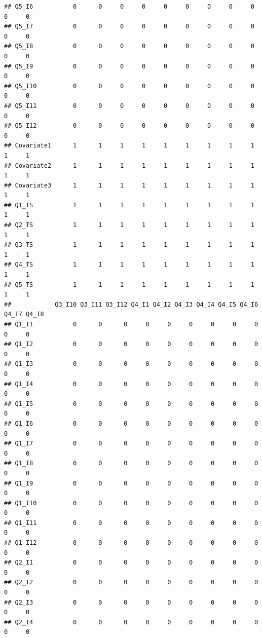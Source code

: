 \documentclass[
]{book}
\begin{document}
\begin{verbatim}
## Q5_I6           0      0     0     0     0     0     0     0     0     0     0
## Q5_I7           0      0     0     0     0     0     0     0     0     0     0
## Q5_I8           0      0     0     0     0     0     0     0     0     0     0
## Q5_I9           0      0     0     0     0     0     0     0     0     0     0
## Q5_I10          0      0     0     0     0     0     0     0     0     0     0
## Q5_I11          0      0     0     0     0     0     0     0     0     0     0
## Q5_I12          0      0     0     0     0     0     0     0     0     0     0
## Covariate1      1      1     1     1     1     1     1     1     1     1     1
## Covariate2      1      1     1     1     1     1     1     1     1     1     1
## Covariate3      1      1     1     1     1     1     1     1     1     1     1
## Q1_TS           1      1     1     1     1     1     1     1     1     1     1
## Q2_TS           1      1     1     1     1     1     1     1     1     1     1
## Q3_TS           1      1     1     1     1     1     1     1     1     1     1
## Q4_TS           1      1     1     1     1     1     1     1     1     1     1
## Q5_TS           1      1     1     1     1     1     1     1     1     1     1
##            Q3_I10 Q3_I11 Q3_I12 Q4_I1 Q4_I2 Q4_I3 Q4_I4 Q4_I5 Q4_I6 Q4_I7 Q4_I8
## Q1_I1           0      0      0     0     0     0     0     0     0     0     0
## Q1_I2           0      0      0     0     0     0     0     0     0     0     0
## Q1_I3           0      0      0     0     0     0     0     0     0     0     0
## Q1_I4           0      0      0     0     0     0     0     0     0     0     0
## Q1_I5           0      0      0     0     0     0     0     0     0     0     0
## Q1_I6           0      0      0     0     0     0     0     0     0     0     0
## Q1_I7           0      0      0     0     0     0     0     0     0     0     0
## Q1_I8           0      0      0     0     0     0     0     0     0     0     0
## Q1_I9           0      0      0     0     0     0     0     0     0     0     0
## Q1_I10          0      0      0     0     0     0     0     0     0     0     0
## Q1_I11          0      0      0     0     0     0     0     0     0     0     0
## Q1_I12          0      0      0     0     0     0     0     0     0     0     0
## Q2_I1           0      0      0     0     0     0     0     0     0     0     0
## Q2_I2           0      0      0     0     0     0     0     0     0     0     0
## Q2_I3           0      0      0     0     0     0     0     0     0     0     0
## Q2_I4           0      0      0     0     0     0     0     0     0     0     0

\end{verbatim}
\end{document}
